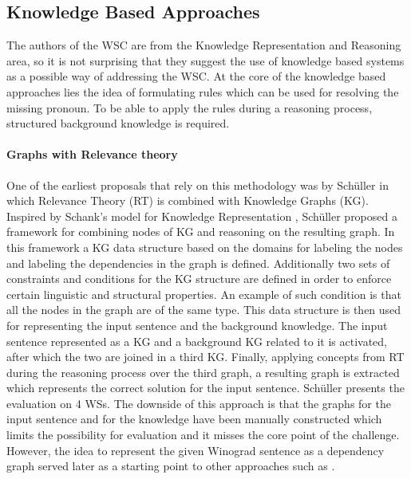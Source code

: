 \subsection{Knowledge Based Approaches}
The authors of the WSC are from the Knowledge Representation and Reasoning area, so it is not surprising that they suggest the use of knowledge based systems as a possible way of addressing the WSC. At the core of the knowledge based approaches lies the idea of formulating rules which can be used for resolving the missing pronoun. To be able to apply the rules during a reasoning process, structured background knowledge is required.

\paragraph{Graphs with Relevance theory}
One of the earliest proposals that rely on this methodology was by Sch{\"u}ller \cite{DBLP:conf/kr/Schuller14} in which Relevance Theory (RT) \cite{Wilson2002-WILRT} is combined with Knowledge Graphs (KG). Inspired by Schank's model for Knowledge Representation \cite{SCHANK1972552}, Sch{\"u}ller proposed a framework for combining nodes of KG and reasoning on the resulting graph. 
In this framework a KG data structure based on the domains for labeling the nodes and labeling the dependencies in the graph is defined. Additionally two sets of constraints and conditions for the KG structure are defined in order to enforce certain linguistic and structural properties. An example of such condition is that all the nodes in the graph are of the same type.  This data structure is then used for representing the input sentence and the background knowledge. 
The input sentence represented as a KG and a background KG related to it is activated, after which the two are joined in a third KG. Finally, applying concepts from RT during the reasoning process over the third graph, a resulting graph is extracted which represents the correct solution for the input sentence. Sch{\"u}ller \cite{DBLP:conf/kr/Schuller14} presents the evaluation on 4 WSs. The downside of this approach is that the graphs for the input sentence and for the knowledge have been manually constructed which limits the possibility for evaluation and it misses the core point of the challenge. However, the idea to represent the given Winograd sentence as a dependency graph served later as a starting point to other approaches such as \cite{DBLP:conf/ijcai/SharmaVAB15}.

